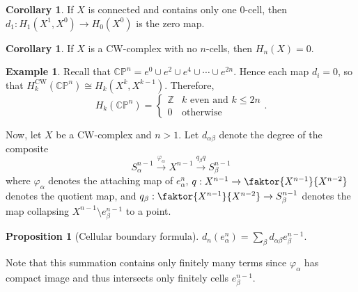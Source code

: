 \documentclass[10pt,letterpaper,cm]{nupset}
\theoremstyle{definition}
\newtheorem{exmp}[definition]{Example}
\theoremstyle{theorem}
\newtheorem{prop}[definition]{Proposition}
\newtheorem{corollary}[definition]{Corollary}
\theoremstyle{remark}
\newcommand{\CP}{\mathbb{CP}}
\newcommand{\Z}{\mathbb Z}
\newcommand{\1}{\mathbb{1}}
\newcommand{\0}{\vec 0}
\newcommand{\cw}{\mathrm{CW}}
\begin{document}
\begin{corollary}\label{c19}
If $X$ is connected and contains only one $0$-cell, then $d_1 : H_1(X^1, X^0) \to H_0(X^0)$ is the zero map.
\end{corollary}

\begin{corollary}
If $X$ is a CW-complex with no $n$-cells, then $H_n(X) =0$.
\end{corollary}

\begin{exmp}
Recall that $\CP^n = e^0 \cup e^2 \cup e^4 \cup \cdots \cup e^{2n}$. Hence each map $d_i =0$, so that $H_k^{\cw}(\CP^n)\cong H_k(X^k, X^{k-1})$. Therefore, $$H_k(\CP^n) = \begin{cases}  \Z & k \text{ even and } k\leq 2n  \\ 0 & \text{otherwise}  \end{cases}.$$
\end{exmp}

\medskip

Now, let $X$ be a CW-complex and $n>1$. Let $d_{\alpha \beta}$ denote the degree of the composite $$S_{\alpha}^{n-1} \overset{\varphi_{\alpha}}{\longrightarrow} X^{n-1} \overset{q_{\beta}q}{\longrightarrow} S_{\beta}^{n-1}$$ where $\varphi_{\alpha}$ denotes the attaching map of $e_{\alpha}^n$, $q: X^{n-1} \to \faktor{X^{n-1}}{X^{n-2}}$ denotes the quotient map, and $q_{\beta} : \faktor{X^{n-1}}{X^{n-2}} \to S_{\beta}^{n-1}$ denotes the map collapsing $X^{n-1} \setminus e_{\beta}^{n-1}$ to a point. 

\begin{prop}[Cellular boundary formula]
$ d_n(e_{\alpha}^n) = \sum_{\beta} d_{\alpha{\beta}}e_{\beta}^{n-1} .$
\end{prop}

 Note that this summation contains only finitely many terms since $\varphi_{\alpha}$ has compact image and thus intersects only finitely cells $e_{\beta}^{n-1}$.
\end{document}
